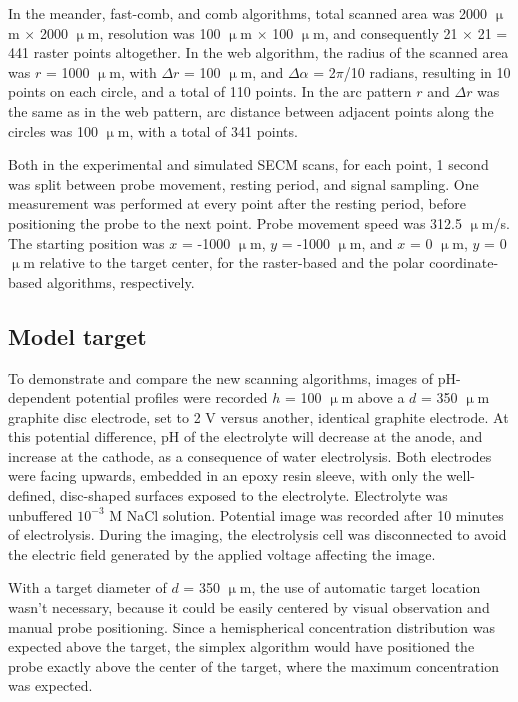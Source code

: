 \documentclass[3p]{elsarticle}
\begin{document}
In the meander, fast-comb, and comb algorithms, total scanned area was 2000 $\upmu$m $\times$ 2000 $\upmu$m, resolution was 100 $\upmu$m $\times$ 100 $\upmu$m, and consequently 21 $\times$ 21 = 441 raster points altogether. In the web algorithm, the radius of the scanned area was $r$ = 1000 $\upmu$m, with $\Delta r$ = 100 $\upmu$m, and $\Delta \alpha$ = 2$\pi$/10 radians, resulting in 10 points on each circle, and a total of 110 points. In the arc pattern $r$ and $\Delta r$ was the same as in the web pattern, arc distance between adjacent points along the circles was 100 $\upmu$m, with a total of 341 points.

Both in the experimental and simulated SECM scans, for each point, 1 second was split between probe movement, resting period, and signal sampling. One measurement was performed at every point after the resting period, before positioning the probe to the next point. Probe movement speed was 312.5 $\upmu$m/s. The starting position was $x$ = -1000 $\upmu$m, $y$ = -1000 $\upmu$m, and $x$ = 0 $\upmu$m, $y$ = 0 $\upmu$m relative to the target center, for the raster-based and the polar coordinate-based algorithms, respectively.

\subsection{Model target}
To demonstrate and compare the new scanning algorithms, images of pH-dependent potential profiles were recorded $h$ = 100 $\upmu$m above a $d$ = 350 $\upmu$m graphite disc electrode, set to 2 V versus another, identical graphite electrode. At this potential difference, pH of the electrolyte will decrease at the anode, and increase at the cathode, as a consequence of water electrolysis. Both electrodes were facing upwards, embedded in an epoxy resin sleeve, with only the well-defined, disc-shaped surfaces exposed to the electrolyte. Electrolyte was unbuffered $10^{-3}$ M NaCl solution. Potential image was recorded after 10 minutes of electrolysis. During the imaging, the electrolysis cell was disconnected to avoid the electric field generated by the applied voltage affecting the image.

With a target diameter of $d$ = 350 $\upmu$m, the use of automatic target location wasn't necessary, because it could be easily centered by visual observation and manual probe positioning. Since a hemispherical concentration distribution was expected above the target, the simplex algorithm would have positioned the probe exactly above the center of the target, where the maximum concentration was expected.
\end{document}
